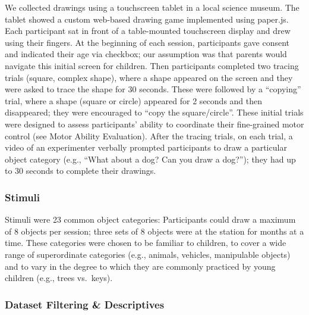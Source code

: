 \documentclass[10pt, letterpaper]{article}
\begin{document}
We collected drawings using a touchscreen tablet in a local science
museum. The tablet showed a custom web-based drawing game implemented
using paper.js. Each participant sat in front of a table-mounted
touchscreen display and drew using their fingers. At the beginning of
each session, participants gave consent and indicated their age via
checkbox; our assumption was that parents would navigate this initial
screen for children. Then participants completed two tracing trials
(square, complex shape), where a shape appeared on the screen and they
were asked to trace the shape for 30 seconds. These were followed by a
``copying'' trial, where a shape (square or circle) appeared for 2
seconds and then disappeared; they were encouraged to ``copy the
square/circle''. These initial trials were designed to assess
participants' ability to coordinate their fine-grained motor control
(see Motor Ability Evaluation). After the tracing trials, on each trial,
a video of an experimenter verbally prompted participants to draw a
particular object category (e.g., ``What about a dog? Can you draw a
dog?''); they had up to 30 seconds to complete their drawings.

\subsubsection{Stimuli}\label{stimuli}

Stimuli were 23 common object categories: Participants could draw a
maximum of 8 objects per session; three sets of 8 objects were at the
station for months at a time. These categories were chosen to be
familiar to children, to cover a wide range of superordinate categories
(e.g., animals, vehicles, manipulable objects) and to vary in the degree
to which they are commonly practiced by young children (e.g., trees
vs.~keys).

\subsubsection{Dataset Filtering \&
Descriptives}\label{dataset-filtering-descriptives}
\end{document}
